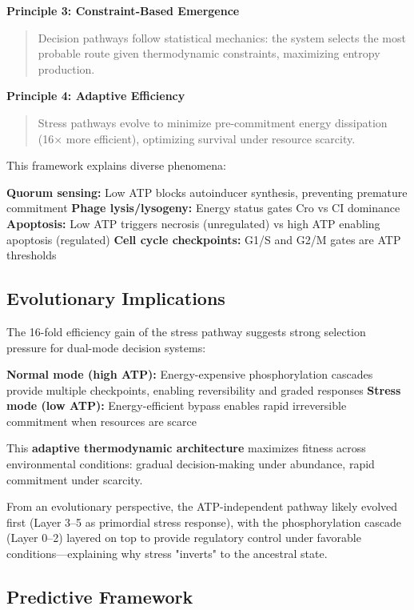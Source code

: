 \documentclass[twocolumn,11pt]{article}
\begin{document}
\textbf{Principle 3: Constraint-Based Emergence}
\begin{quote}
    Decision pathways follow statistical mechanics: the system selects the most probable route given thermodynamic constraints, maximizing entropy production.
\end{quote}

\textbf{Principle 4: Adaptive Efficiency}
\begin{quote}
    Stress pathways evolve to minimize pre-commitment energy dissipation (16× more efficient), optimizing survival under resource scarcity.
\end{quote}

This framework explains diverse phenomena:

\textbf{Quorum sensing:} Low ATP blocks autoinducer synthesis, preventing premature commitment
\textbf{Phage lysis/lysogeny:} Energy status gates Cro vs CI dominance
\textbf{Apoptosis:} Low ATP triggers necrosis (unregulated) vs high ATP enabling apoptosis (regulated)
\textbf{Cell cycle checkpoints:} G1/S and G2/M gates are ATP thresholds


\subsection{Evolutionary Implications}

The 16-fold efficiency gain of the stress pathway suggests strong selection pressure for dual-mode decision systems:


\textbf{Normal mode (high ATP):} Energy-expensive phosphorylation cascades provide multiple checkpoints, enabling reversibility and graded responses
\textbf{Stress mode (low ATP):} Energy-efficient bypass enables rapid irreversible commitment when resources are scarce


This \textbf{adaptive thermodynamic architecture} maximizes fitness across environmental conditions: gradual decision-making under abundance, rapid commitment under scarcity.

From an evolutionary perspective, the ATP-independent pathway likely evolved first (Layer 3--5 as primordial stress response), with the phosphorylation cascade (Layer 0--2) layered on top to provide regulatory control under favorable conditions—explaining why stress "inverts" to the ancestral state.

\subsection{Predictive Framework}
\end{document}
